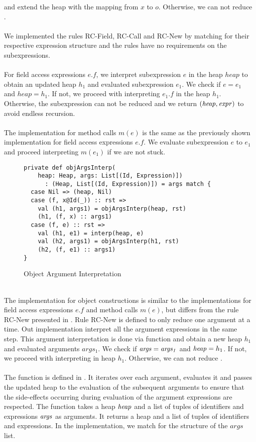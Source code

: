 and extend the heap with the mapping from $x$ to $o$.
Otherwise, we can not reduce .\\
\\
We implemented the rules RC-Field, RC-Call and RC-New
by matching for their respective expression structure
and the rules have no requirements on the subexpressions.\\
\\
For field access expressions $e.f$,
we interpret subexpression $e$ in the heap $heap$
to obtain an updated heap $h_1$ and evaluated subexpression $e_1$.
We check if $e = e_1$ and $heap = h_1$.
If not, we proceed with interpreting $e_1.f$ in the heap $h_1$.
Otherwise, the subexpression can not be reduced
and we return $(\mathit{heap}, \mathit{expr})$ to avoid endless recursion.\\
\\
The implementation for method calls $m(e)$ is the same
as the previously shown implementation for field access expressions $e.f$.
We evaluate subexpression $e$ to $e_1$ and proceed
interpreting $m(e_1)$ if we are not stuck.
%
\begin{figure}[h]
\begin{lstlisting}
private def objArgsInterp(
    heap: Heap, args: List[(Id, Expression)])
      : (Heap, List[(Id, Expression)]) = args match {
  case Nil => (heap, Nil)
  case (f, x@Id(_)) :: rst =>
    val (h1, args1) = objArgsInterp(heap, rst)
    (h1, (f, x) :: args1)
  case (f, e) :: rst =>
    val (h1, e1) = interp(heap, e)
    val (h2, args1) = objArgsInterp(h1, rst)
    (h2, (f, e1) :: args1)
}
\end{lstlisting}
\caption{Object Argument Interpretation}
\label{fig:scala-objArgsInterp}
\end{figure}\\
%
The implementation for object constructions 
is similar to the implementations for field access expressions $e.f$
and method calls $m(e)$,
but differs from the rule RC-New presented in .
Rule RC-New is defined to only reduce one argument at a time.
Out implementation interpret all the argument expressions in the same step.
This argument interpretation is done via function 
and obtain a new heap $h_1$ and evaluated arguments $args_1$.
We check if $\mathit{args} = \mathit{args_1}$ and $\mathit{heap} = h_1$.
If not, we proceed with interpreting  in heap $h_1$.
Otherwise, we can not reduce .\\
\\
The function  is defined in .
It iterates over each argument, evaluates it
and passes the updated heap to the evaluation of the subsequent arguments
to ensure that the side-effects occurring during evaluation
of the argument expressions are respected.
The function takes a heap $\mathit{heap}$ and a list of tuples of
identifiers and expressions $\mathit{args}$ as arguments.
It returns a heap and a list of tuples of identifiers and expressions.
In the implementation, we match for the structure of the $args$ list.

